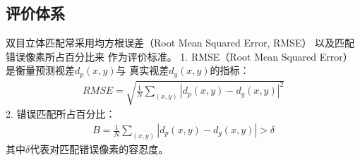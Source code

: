 \subsection{评价体系}
双目立体匹配常采用均方根误差（Root Mean Squared Error, RMSE）
以及匹配错误像素所占百分比来
作为评价标准。
1. RMSE（Root Mean Squared Error）是衡量预测视差$d_p(x,y)$与
真实视差$d_g(x,y)$的指标：
\begin{align}
	RMSE = \sqrt{\frac{1}{N}\sum_{(x,y)}|d_p(x,y)-d_g(x,y)|^2}
\end{align}
2. 错误匹配所占百分比：
\begin{align}
	B = \frac{1}{N}\sum_{(x,y)}|d_p(x,y)-d_g(x,y)| > \delta
\end{align}
其中$\delta$代表对匹配错误像素的容忍度。
%
%
%
